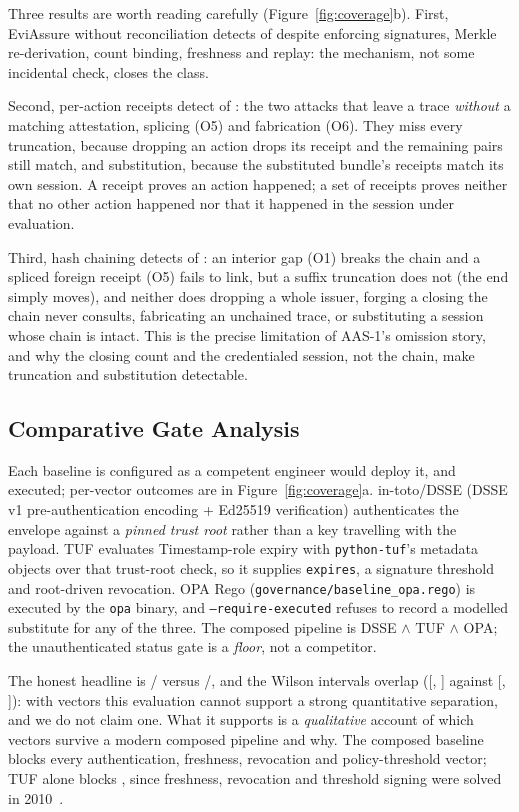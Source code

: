 \documentclass[letterpaper,10pt,twocolumn]{article}
\theoremstyle{definition}
\begin{document}
Three results are worth reading carefully (Figure~\ref{fig:coverage}b). First, EviAssure without reconciliation detects \omNoWtc{} of \omVectors{} despite enforcing signatures, Merkle re-derivation, count binding, freshness and replay: the mechanism, not some incidental check, closes the class.

Second, per-action receipts detect \omReceipts{} of \omVectors{}: the two attacks that leave a trace \emph{without} a matching attestation, splicing (O5) and fabrication (O6). They miss every truncation, because dropping an action drops its receipt and the remaining pairs still match, and substitution, because the substituted bundle's receipts match its own session. A receipt proves an action happened; a set of receipts proves neither that no other action happened nor that it happened in the session under evaluation.

Third, hash chaining detects \omChain{} of \omVectors{}: an interior gap (O1) breaks the chain and a spliced foreign receipt (O5) fails to link, but a suffix truncation does not (the end simply moves), and neither does dropping a whole issuer, forging a closing the chain never consults, fabricating an unchained trace, or substituting a session whose chain is intact. This is the precise limitation of AAS-1's omission story, and why the closing count and the credentialed session, not the chain, make truncation and substitution detectable.

\subsection{Comparative Gate Analysis}\label{sec:comparative}
Each baseline is configured as a competent engineer would deploy it, and executed; per-vector outcomes are in Figure~\ref{fig:coverage}a. in-toto/DSSE (DSSE v1 pre-authentication encoding + Ed25519 verification) authenticates the envelope against a \emph{pinned trust root} rather than a key travelling with the payload. TUF evaluates Timestamp-role expiry with \texttt{python-tuf}'s metadata objects over that trust-root check, so it supplies \texttt{expires}, a signature threshold and root-driven revocation. OPA Rego (\nolinkurl{governance/baseline_opa.rego}) is executed by the \texttt{opa} binary, and \texttt{--require-executed} refuses to record a modelled substitute for any of the three. The composed pipeline is DSSE $\wedge$ TUF $\wedge$ OPA; the unauthenticated status gate is a \emph{floor}, not a competitor.

The honest headline is \eviBlocked/\eviTotal{} versus \compBlocked/\compTotal{}, and the Wilson intervals overlap ([\eviCIlo, \eviCIhi] against [\compCIlo, \compCIhi]): with \eviTotal{} vectors this evaluation cannot support a strong quantitative separation, and we do not claim one. What it supports is a \emph{qualitative} account of which vectors survive a modern composed pipeline and why. The composed baseline blocks every authentication, freshness, revocation and policy-threshold vector; TUF alone blocks \tufBlocked{}, since freshness, revocation and threshold signing were solved in 2010~\cite{samuel2010surviving}.
\end{document}

